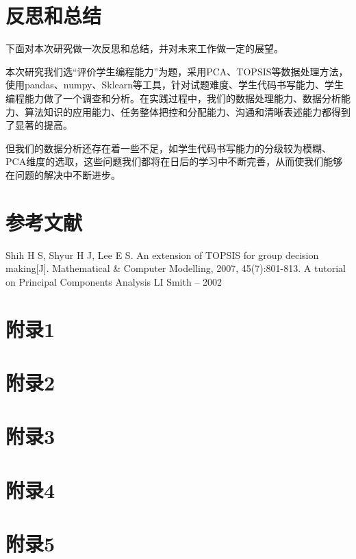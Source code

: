 \documentclass[UTF8]{ctexart}
\begin{document}
	\section{反思和总结}\label{sec5}
	下面对本次研究做一次反思和总结，并对未来工作做一定的展望。
	\par 本次研究我们选“评价学生编程能力”为题，采用PCA、TOPSIS等数据处理方法，使用pandas、numpy、Sklearn等工具，针对试题难度、学生代码书写能力、学生编程能力做了一个调查和分析。在实践过程中，我们的数据处理能力、数据分析能力、算法知识的应用能力、任务整体把控和分配能力、沟通和清晰表述能力都得到了显著的提高。
	\par 但我们的数据分析还存在着一些不足，如学生代码书写能力的分级较为模糊、PCA维度的选取，这些问题我们都将在日后的学习中不断完善，从而使我们能够在问题的解决中不断进步。
	
	\section{参考文献}\label{sec:sec4}
	\small
	\begin{thebibliography}{1}
		 Shih H S, Shyur H J, Lee E S. An extension of TOPSIS for group decision making[J]. Mathematical \& Computer Modelling, 2007, 45(7):801-813.
		 A tutorial on Principal Components Analysis LI Smith – 2002
	\end{thebibliography}
	\begin{appendices} 
		\section{附录1} 
		
		\section{附录2} 
		
		\section{附录3} 
		

			\section{附录4} 
		
			\section{附录5} 
		
	\end{appendices}
	
\end{document}
